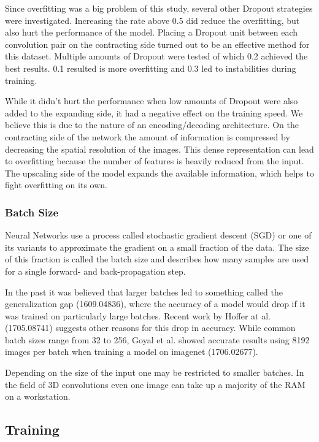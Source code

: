 Since overfitting was a big problem of this study, several other Dropout strategies were investigated. Increasing the rate above 0.5 did reduce the overfitting, but also hurt the performance of the model. Placing a Dropout unit between each convolution pair on the contracting side turned out to be an effective method for this dataset. Multiple amounts of Dropout were tested of which 0.2 achieved the best results. 0.1 resulted is more overfitting and 0.3 led to instabilities during training.

While it didn't hurt the performance when low amounts of Dropout were also added to the expanding side, it had a negative effect on the training speed. We believe this is due to the nature of an encoding/decoding architecture. On the contracting side of the network the amount of information is compressed by decreasing the spatial resolution of the images. This dense representation can lead to overfitting because the number of features is heavily reduced from the input. The upscaling side of the model expands the available information, which helps to fight overfitting on its own.


\subsubsection{Batch Size}

Neural Networks use a process called stochastic gradient descent (SGD) or one of its variants to approximate the gradient on a small fraction of the data. The size of this fraction is called the batch size and describes how many samples are used for a single forward- and back-propagation step.

In the past it was believed that larger batches led to something called the generalization gap (1609.04836), where the accuracy of a model would drop if it was trained on particularly large batches. Recent work by Hoffer at al. (1705.08741) suggests other reasons for this drop in accuracy. While common batch sizes range from 32 to 256, Goyal et al. showed accurate results using 8192 images per batch when training a model on imagenet (1706.02677).

Depending on the size of the input one may be restricted to smaller batches. In the field of 3D convolutions even one image can take up a majority of the RAM on a workstation.

\subsection{Training}

